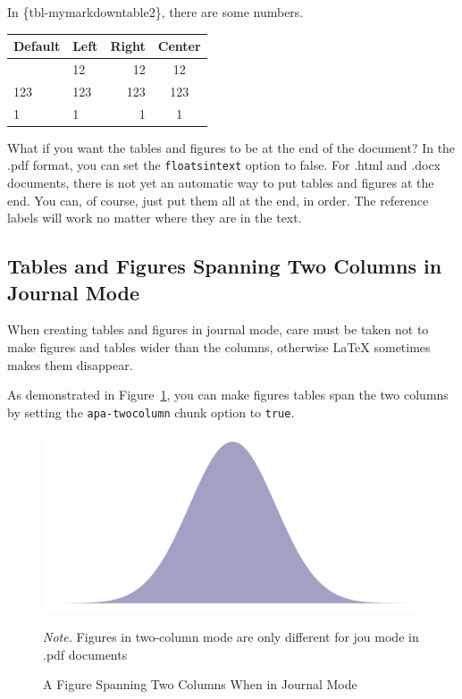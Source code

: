 \documentclass[
  jou,
  floatsintext,
  longtable,
  nolmodern,
  notxfonts,
  notimes,
  colorlinks=true,linkcolor=blue,citecolor=blue,urlcolor=blue]{apa7}
\begin{document}
In \{tbl-mymarkdowntable2\}, there are some numbers.

\begin{longtable}[]{@{}llrc@{}}
\toprule\noalign{}
Default & Left & Right & Center \\
\midrule\noalign{}
\endhead
\bottomrule\noalign{}
\endlastfoot
12 & 12 & 12 & 12 \\
123 & 123 & 123 & 123 \\
1 & 1 & 1 & 1 \\
\end{longtable}

What if you want the tables and figures to be at the end of the
document? In the .pdf format, you can set the \texttt{floatsintext}
option to false. For .html and .docx documents, there is not yet an
automatic way to put tables and figures at the end. You can, of course,
just put them all at the end, in order. The reference labels will work
no matter where they are in the text.

\subsection{Tables and Figures Spanning Two Columns in Journal
Mode}\label{tables-and-figures-spanning-two-columns-in-journal-mode}

When creating tables and figures in journal mode, care must be taken not
to make figures and tables wider than the columns, otherwise \LaTeX
sometimes makes them disappear.

As demonstrated in Figure~\ref{fig-twocolumn}, you can make figures
tables span the two columns by setting the \texttt{apa-twocolumn} chunk
option to \texttt{true}.

\begin{figure}[!htbp]

{\caption{{A Figure Spanning Two Columns When in Journal
Mode}{\label{fig-twocolumn}}}}

\begin{center}
\includegraphics{example_files/figure-pdf/fig-twocolumn-1.pdf}
\end{center}

{\noindent \emph{Note.} Figures in two-column mode are only different
for jou mode in .pdf documents}

\end{figure}
\end{document}
